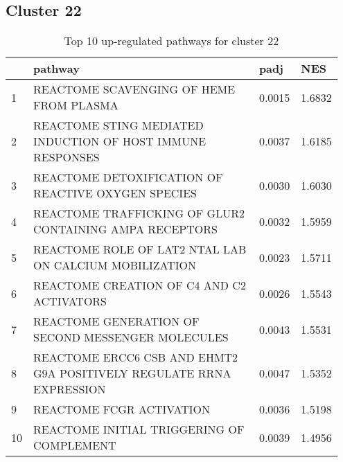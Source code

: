 \documentclass{article}
\begin{document}
\subsection{Cluster 22 }
\begin{table}[H]
\centering
\begin{tabular}{p{0.05\linewidth}p{0.7\linewidth}p{0.1\linewidth}p{0.1\linewidth}}
  \hline
 & pathway & padj & NES \\ 
  \hline
1 & REACTOME SCAVENGING OF HEME FROM PLASMA & 0.0015 & 1.6832 \\ 
  2 & REACTOME STING MEDIATED INDUCTION OF HOST IMMUNE RESPONSES & 0.0037 & 1.6185 \\ 
  3 & REACTOME DETOXIFICATION OF REACTIVE OXYGEN SPECIES & 0.0030 & 1.6030 \\ 
  4 & REACTOME TRAFFICKING OF GLUR2 CONTAINING AMPA RECEPTORS & 0.0032 & 1.5959 \\ 
  5 & REACTOME ROLE OF LAT2 NTAL LAB ON CALCIUM MOBILIZATION & 0.0023 & 1.5711 \\ 
  6 & REACTOME CREATION OF C4 AND C2 ACTIVATORS & 0.0026 & 1.5543 \\ 
  7 & REACTOME GENERATION OF SECOND MESSENGER MOLECULES & 0.0043 & 1.5531 \\ 
  8 & REACTOME ERCC6 CSB AND EHMT2 G9A POSITIVELY REGULATE RRNA EXPRESSION & 0.0047 & 1.5352 \\ 
  9 & REACTOME FCGR ACTIVATION & 0.0036 & 1.5198 \\ 
  10 & REACTOME INITIAL TRIGGERING OF COMPLEMENT & 0.0039 & 1.4956 \\ 
   \hline
\end{tabular}
\caption{Top 10 up-regulated pathways for cluster 22} 
\label{tab:q3_2_22}
\end{table}
\end{document}
